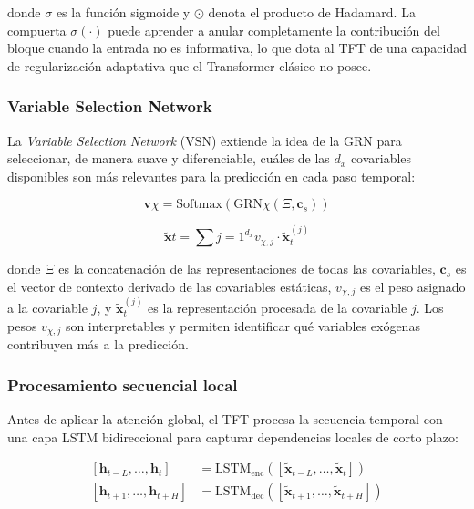 donde $\sigma$ es la función sigmoide y $\odot$ denota el producto de Hadamard. La compuerta $\sigma(\cdot)$ puede aprender a anular completamente la contribución del bloque cuando la entrada no es informativa, lo que dota al TFT de una capacidad de regularización adaptativa que el Transformer clásico no posee.

\subsubsection{Variable Selection Network}

La \textit{Variable Selection Network} (VSN) extiende la idea de la GRN para seleccionar, de manera suave y diferenciable, cuáles de las $d_x$ covariables disponibles son más relevantes para la predicción en cada paso temporal:

\begin{equation}
\mathbf{v}\chi = \text{Softmax}\left(\text{GRN}\chi\left(\Xi, \mathbf{c}_s\right)\right)
\end{equation}

\begin{equation}
\tilde{\mathbf{x}}t = \sum{j=1}^{d_x} v_{\chi,j}\cdot \tilde{\mathbf{x}}_{t}^{(j)}
\end{equation}

donde $\Xi$ es la concatenación de las representaciones de todas las covariables, $\mathbf{c}_s$ es el vector de contexto derivado de las covariables estáticas, $v_{\chi,j}$ es el peso asignado a la covariable $j$, y $\tilde{\mathbf{x}}_{t}^{(j)}$ es la representación procesada de la covariable $j$. Los pesos $v_{\chi,j}$ son interpretables y permiten identificar qué variables exógenas contribuyen más a la predicción.

\subsubsection{Procesamiento secuencial local}

Antes de aplicar la atención global, el TFT procesa la secuencia temporal con una capa LSTM bidireccional para capturar dependencias locales de corto plazo:

\begin{align}
    \left[\mathbf{h}_{t-L}, \ldots, \mathbf{h}_t\right] &= \text{LSTM}_{\text{enc}}\left(\left[\tilde{\mathbf{x}}_{t-L}, \ldots, \tilde{\mathbf{x}}_t\right]\right) \\
    \left[\mathbf{h}_{t+1}, \ldots, \mathbf{h}_{t+H}\right] &= \text{LSTM}_{\text{dec}}\left(\left[\tilde{\mathbf{x}}_{t+1}, \ldots, \tilde{\mathbf{x}}_{t+H}\right]\right)
\end{align}

